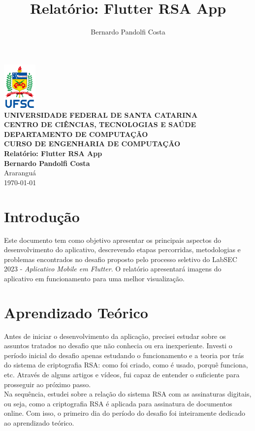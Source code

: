 \documentclass[a4paper,12pt]{article}
\author{Bernardo Pandolfi Costa}
\title{Relatório: Flutter RSA App}
\begin{document}
\begin{titlepage}
    \begin{center}
    \includegraphics[width=64px]{./assets/vertical_sigla_fundo_claro.png}\\
        \small
        \vspace{0.25cm}
        \textbf{UNIVERSIDADE FEDERAL DE SANTA CATARINA}\\
		\textbf{CENTRO DE CIÊNCIAS, TECNOLOGIAS E SAÚDE}\\
		\textbf{DEPARTAMENTO DE COMPUTAÇÃO}\\
		\textbf{CURSO DE ENGENHARIA DE COMPUTAÇÃO}\\
        \vspace{7cm}
        \Large
        \textbf{Relatório: Flutter RSA App}\\
        \vspace{0.5cm}
        \normalsize
        \textbf{Bernardo Pandolfi Costa }\\
        \vspace{1.5cm}
        \small
        \vfill
        Araranguá\\
        \today
    \end{center}
\end{titlepage}

\tableofcontents

\newpage

\section{Introdução}
Este documento tem como objetivo apresentar os principais aspectos do desenvolvimento do aplicativo, descrevendo etapas percorridas, metodologias e problemas encontrados no desafio proposto pelo processo seletivo do LabSEC 2023 - \textit{Aplicativo Mobile em Flutter}. O relatório apresentará imagens do aplicativo em funcionamento para uma melhor visualização.
\newpage
\section{Aprendizado Teórico}

Antes de iniciar o desenvolvimento da aplicação, precisei estudar sobre os assuntos tratados no desafio que não conhecia ou era inexperiente. Investi o período inicial do desafio apenas estudando o funcionamento e a teoria por trás do sistema de criptografia RSA: como foi criado, como é usado, porquê funciona, etc. Através de alguns artigos e vídeos, fui capaz de entender o suficiente para prosseguir ao próximo passo.\\
Na sequência, estudei sobre a relação do sistema RSA com as assinaturas digitais, ou seja, como a criptografia RSA é aplicada para assinatura de documentos online. Com isso, o primeiro dia do período do desafio foi inteiramente dedicado ao aprendizado teórico.
\newpage
\end{document}
